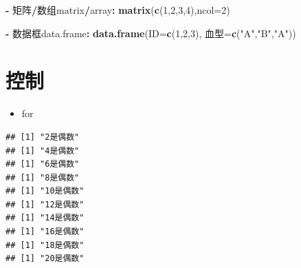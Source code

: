 \documentclass[]{book}
\newenvironment{Shaded}{\begin{snugshade}}{\end{snugshade}}
\newcommand{\ControlFlowTok}[1]{\textcolor[rgb]{0.13,0.29,0.53}{\textbf{#1}}}
\newcommand{\DataTypeTok}[1]{\textcolor[rgb]{0.13,0.29,0.53}{#1}}
\newcommand{\DecValTok}[1]{\textcolor[rgb]{0.00,0.00,0.81}{#1}}
\newcommand{\KeywordTok}[1]{\textcolor[rgb]{0.13,0.29,0.53}{\textbf{#1}}}
\newcommand{\NormalTok}[1]{#1}
\newcommand{\OperatorTok}[1]{\textcolor[rgb]{0.81,0.36,0.00}{\textbf{#1}}}
\newcommand{\StringTok}[1]{\textcolor[rgb]{0.31,0.60,0.02}{#1}}
\providecommand{\tightlist}{%
  \setlength{\itemsep}{0pt}\setlength{\parskip}{0pt}}
\begin{document}
\begin{Shaded}
\begin{Highlighting}[]
\OperatorTok{-}\StringTok{ }\NormalTok{矩阵}\OperatorTok{/}\NormalTok{数组matrix}\OperatorTok{/}\NormalTok{array}\OperatorTok{:}\StringTok{ }\KeywordTok{matrix}\NormalTok{(}\KeywordTok{c}\NormalTok{(}\DecValTok{1}\NormalTok{,}\DecValTok{2}\NormalTok{,}\DecValTok{3}\NormalTok{,}\DecValTok{4}\NormalTok{),}\DataTypeTok{ncol=}\DecValTok{2}\NormalTok{)}
\end{Highlighting}
\end{Shaded}

\begin{Shaded}
\begin{Highlighting}[]
\OperatorTok{-}\StringTok{ }\NormalTok{数据框data.frame}\OperatorTok{:}\StringTok{ }\KeywordTok{data.frame}\NormalTok{(}\DataTypeTok{ID=}\KeywordTok{c}\NormalTok{(}\DecValTok{1}\NormalTok{,}\DecValTok{2}\NormalTok{,}\DecValTok{3}\NormalTok{), 血型=}\KeywordTok{c}\NormalTok{(}\StringTok{"A"}\NormalTok{,}\StringTok{"B"}\NormalTok{,}\StringTok{"A"}\NormalTok{))}
\end{Highlighting}
\end{Shaded}

\hypertarget{section-5}{%
\section{控制}\label{section-5}}

\begin{itemize}
\tightlist
\item
  for
\end{itemize}

\begin{Shaded}
\end{Shaded}

\begin{verbatim}
## [1] "2是偶数"
## [1] "4是偶数"
## [1] "6是偶数"
## [1] "8是偶数"
## [1] "10是偶数"
## [1] "12是偶数"
## [1] "14是偶数"
## [1] "16是偶数"
## [1] "18是偶数"
## [1] "20是偶数"
\end{verbatim}
\end{document}
